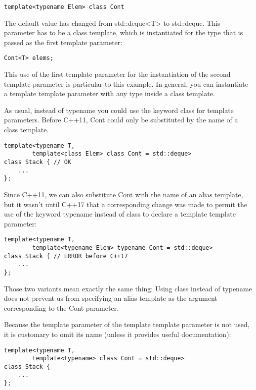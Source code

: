 \begin{lstlisting}[style=styleCXX]
template<typename Elem> class Cont
\end{lstlisting}

The default value has changed from std::deque<T> to std::deque. This parameter has to be a class template, which is instantiated for the type that is passed as the first template parameter:

\begin{lstlisting}[style=styleCXX]
Cont<T> elems;
\end{lstlisting}

This use of the first template parameter for the instantiation of the second template parameter is particular to this example. In general, you can instantiate a template template parameter with any type inside a class template.

As usual, instead of typename you could use the keyword class for template parameters. Before C++11, Cont could only be substituted by the name of a class template.

\begin{lstlisting}[style=styleCXX]
template<typename T,
		template<class Elem> class Cont = std::deque>
class Stack { // OK
	...
};
\end{lstlisting}

Since C++11, we can also substitute Cont with the name of an alias template, but it wasn’t until C++17 that a corresponding change was made to permit the use of the keyword typename instead of class to declare a template template parameter:

\begin{lstlisting}[style=styleCXX]
template<typename T,
		template<typename Elem> typename Cont = std::deque>
class Stack { // ERROR before C++17
	...
};
\end{lstlisting}

Those two variants mean exactly the same thing: Using class instead of typename does not prevent us from specifying an alias template as the argument corresponding to the Cont parameter.

Because the template parameter of the template template parameter is not used, it is customary to omit its name (unless it provides useful documentation):

\begin{lstlisting}[style=styleCXX]
template<typename T,
		template<typename> class Cont = std::deque>
class Stack {
	...
};
\end{lstlisting}


